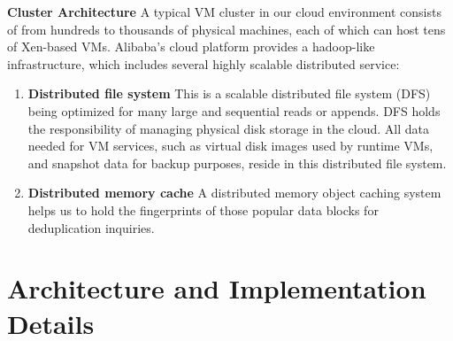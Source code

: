 {%
{\bf Cluster Architecture}
A typical VM cluster in our cloud environment
consists of from hundreds to thousands of physical machines, each of which can
host tens of Xen-based\cite{Barham2003} VMs.
Alibaba's cloud platform provides a hadoop-like infrastructure, 
which includes several highly scalable distributed service:
\begin{enumerate}
\item {\bf Distributed file system} This is a scalable distributed file system (DFS) being optimized for many large and sequential reads or appends. DFS holds the responsibility of managing physical disk storage
in the cloud. All data needed for VM services, such as virtual disk images used by runtime VMs,
and snapshot data for backup purposes, reside in this distributed file system. 
\item {\bf Distributed memory cache} A distributed memory object caching system helps us to hold the fingerprints of those popular data blocks for deduplication inquiries. 
\end{enumerate}
}

\section{Architecture and Implementation Details}
\label{sect:arch}



